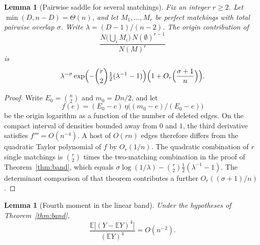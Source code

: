 \documentclass[11pt]{article}
\newtheorem{lemma}[theorem]{Lemma}
\newcommand{\EE}{\mathbb{E}}
\begin{document}
\begin{lemma}[Pairwise saddle for several matchings]
\label{lem:pair-saddle}
Fix an integer \(r\ge 2\). Let \(\min(D,n-D)=\Theta(n)\), and let \(M_1,\ldots,M_r\) be perfect matchings with total pairwise overlap \(\sigma\). Write \(\lambda=(D-1)/(n-2)\). The origin contribution of
\[
\frac{N\bigl(\bigcup_i M_i\bigr)\,N(\emptyset)^{r-1}}{N(M)^r}
\]
is
\[
\lambda^{-\sigma}\exp\Bigl(-\binom{r}{2}\tfrac12(\lambda^{-1}-1)\Bigr)\Bigl(1+O_r\Bigl(\frac{\sigma+1}{n}\Bigr)\Bigr).
\]
\end{lemma}

\begin{proof}
Write \(E_0=\binom{n}{2}\) and \(m_0=Dn/2\), and let
\[
f(e)=(E_0-e)\,\eta\bigl((m_0-e)/(E_0-e)\bigr)
\]
be the origin logarithm as a function of the number of deleted edges.
On the compact interval of densities bounded away from \(0\) and \(1\), the third derivative satisfies \(f'''=O(n^{-4})\).
A host of \(O(rn)\) edges therefore differs from the quadratic Taylor polynomial of \(f\) by \(O_r(1/n)\).
The quadratic combination of \(r\) single matchings is \(\binom{r}{2}\) times the two-matching combination in the proof of Theorem~\ref{thm:band}, which equals \(\sigma\log(1/\lambda)-\binom{r}{2}\tfrac12(\lambda^{-1}-1)\).
The determinant comparison of that theorem contributes a further \(O_r((\sigma+1)/n)\).
\end{proof}

\begin{lemma}[Fourth moment in the linear band]
\label{lem:band-fourth}
Under the hypotheses of Theorem~\ref{thm:band},
\[
\frac{\EE\bigl[(Y-\EE Y)^{4}\bigr]}{(\EE Y)^{4}}
=
O(n^{-2}).
\]
\end{lemma}
\end{document}
